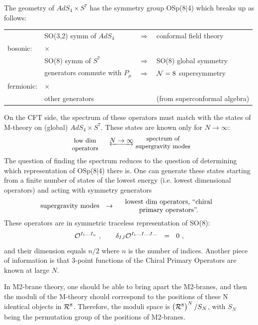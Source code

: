 \documentclass[12pt]{article}
\begin{document}
The geometry of $ AdS_4 \times S^7 $ has the symmetry group OSp(8$|$4) which breaks up as follows:
\begin{center}
\begin{tabular}{llll}
			     &  \parbox{3.0cm}{\small\centering SO(3,2)\\ {\small symm of $AdS_4$}} & $ \Rightarrow $ & conformal field theory \\[1mm]
bosonic:		     &  \parbox{3.0cm}{\small \centering $ \times $} \\
                             &  \parbox{3.0cm}{\small\centering SO(8)\\ {\small symm of $ S^7 $}} & $ \Rightarrow $ & SO(8) global symmetry \\[5mm]
			     &  \parbox{3.0cm}{\small{} generators commute with $P_\mu$}  & $ \Rightarrow $ & $ \mathcal{N}=8 $ supersymmetry \\[1mm]
fermionic:		     &  \parbox{3.0cm}{\small \centering $ \times $} \\
			     &  \parbox{3.0cm}{\small{} other generators} & & (from superconformal algebra)
\end{tabular}
\end{center}

On the CFT side, the spectrum of these operators must match with the states of M-theory on (global) $ AdS_4 \times S^7 $.
These states are known only for $ N \to \infty $:
\[
	\raisebox{-2.0mm}{\parbox{2.0cm}{\small\centering low dim operators}} ~~\underleftrightarrow{N \to \infty} 
	\raisebox{-1.0mm}{\parbox{3.0cm}{\small\centering spectrum of supergravity modes}}
\]
The question of finding the spectrum reduces to the question of determining which representation of OSp(8$|$4) there is.
One can generate these states starting from a finite number of states of the lowest energy (i.e. lowest dimensional operators)
and acting with symmetry generators
\[
	\text{supergravity modes} ~~\to~~ \parbox{5.0cm}{\centering lowest dim operators, ``chiral primary operators''.}
\]
These operators are in symmetric traceless representation of SO(8):
\[
	\mathcal{O}^{I_1 \dots I_n} ~, \qquad \delta_{IJ}\mathcal{O}^{I_1 \dots I \dots J \dots } ~~=~~ 0~,
\]
and their dimension equals $ n / 2 $ where $n$ is the number of indices.
Another piece of information is that 3-point functions of the Chiral Primary Operators are known at large $ N $.

In M2-brane theory, one should be able to bring apart the M2-branes, and then the moduli of the M-theory should correspond to the positions of these
N identical objects in $ \mathcal{R}^8 $.
Therefore, the moduli space is $\left( \mathcal{R}^8 \right)^N / S_N $, with $ S_N $ being the permutation group of the positions of M2-branes.
\end{document}
